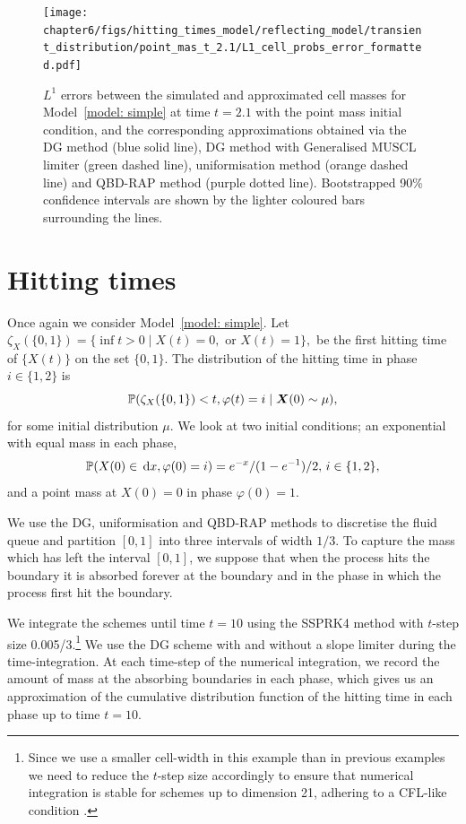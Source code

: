 \begin{figure}[h]
	\centering
	\texttt{[image: chapter6/figs/hitting\_times\_model/reflecting\_model/transient\_distribution/point\_mas\_t\_2.1/L1\_cell\_probs\_error\_formatted.pdf]}
	\caption{\(L^1\) errors between the simulated and approximated cell masses for Model~\ref{model: simple} at time \(t=2.1\) with the point mass initial condition, and the corresponding approximations obtained via the DG method (blue solid line), DG method with Generalised MUSCL limiter (green dashed line), uniformisation method (orange dashed line) and QBD-RAP method (purple dotted line). Bootstrapped 90\% confidence intervals are shown by the lighter coloured bars surrounding the lines.} 
	\label{fig: reflecting transient pm t2.1} 
\end{figure}

\FloatBarrier
\section{Hitting times}\label{sec: return approx}
Once again we consider Model~\ref{model: simple}. Let \(\zeta_{X}(\{0,1\}) = \{\inf t>0 \mid X(t)=0, \mbox{ or }X(t)=1\},\) be the first hitting time of \(\{X(t)\}\) on the set \(\{0,1\}\). The distribution of the hitting time in phase \(i\in\{1,2\}\) is 
\begin{equation}\label{eqn: hit cdf}\mathbb P(\zeta_{X}(\{0,1\}) < t, \varphi(t)=i\mid \boldsymbol X(0)\sim \mu),\end{equation}
for some initial distribution \(\mu\). We look at two initial conditions; an exponential with equal mass in each phase, 
\[\mathbb P(X(0)\in\, \mathrm{d} x,\varphi(0)=i) = e^{-x}/(1-e^{-1})/2,\,i\in\{1,2\},\]
and a point mass at \(X(0)=0\) in phase \(\varphi(0)=1\). 

We use the DG, uniformisation and QBD-RAP methods to discretise the fluid queue and partition \([0,1]\) into three intervals of width \(1/3\). To capture the mass which has left the interval \([0,1]\), we suppose that when the process hits the boundary it is absorbed forever at the boundary and in the phase in which the process first hit the boundary. 

We integrate the schemes until time \(t=10\) using the SSPRK4 method with \(t\)-step size 0.005/3.\footnote{Since we use a smaller cell-width in this example than in previous examples we need to reduce the \(t\)-step size accordingly to ensure that numerical integration is stable for schemes up to dimension 21, adhering to a CFL-like condition \cite[Section~4.8]{nodalDGBook}.} We use the DG scheme with and without a slope limiter during the time-integration. At each time-step of the numerical integration, we record the amount of mass at the absorbing boundaries in each phase, which gives us an approximation of the cumulative distribution function of the hitting time in each phase up to time \(t=10\). 

